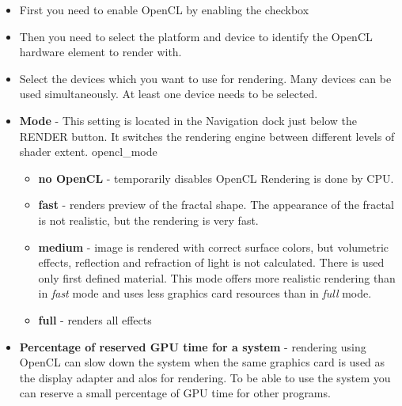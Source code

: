 \begin{itemize}
	\item First you need to enable OpenCL by enabling the checkbox
	
	\item Then you need to select the platform and device to identify the OpenCL hardware 
		element to render with.
		
	\item Select the devices which you want to use for rendering. Many devices can be used simultaneously. At least one device needs to be selected.
	\item \textbf{Mode} - This setting is located in the Navigation dock just below the RENDER button. It switches the rendering engine between different levels of shader extent.
	{opencl_mode}
\begin{itemize}
	\item  \textbf{no OpenCL} - temporarily disables OpenCL  Rendering is done by CPU.
	\item  \textbf{fast} - renders preview of the fractal shape. The appearance of the fractal is not realistic, but the rendering is very fast.
	\item  \textbf{medium} - image is rendered with correct surface colors, but volumetric effects, reflection and refraction of light is not calculated. There is used only first defined material. This mode offers more realistic rendering than in \emph{fast} mode and uses less graphics card resources than in \emph{full} mode. 
	\item  \textbf{full} - renders all effects	
\end{itemize}

	\item \textbf{Percentage of reserved GPU time for a system} - rendering using OpenCL can slow down the system when the same graphics card is used as the display adapter and alos for rendering. To be able to use the system you can reserve a small percentage of GPU time for other programs.
	

\end{itemize}
